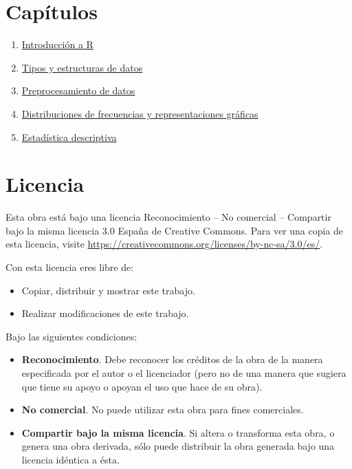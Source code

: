 \documentclass[
  spanish,
  a4paper,
]{scrreport}
\providecommand{\tightlist}{%
  \setlength{\itemsep}{0pt}\setlength{\parskip}{0pt}}
\theoremstyle{definition}
\theoremstyle{remark}
\begin{document}
\section*{Capítulos}\label{capuxedtulos}


\begin{enumerate}
\def\labelenumi{\arabic{enumi}.}
\tightlist
\item
  \href{./01-intro.qmd}{Introducción a R}
\item
  \href{02-tipos-datos.qmd}{Tipos y estructuras de datos}
\item
  \href{03-preprocesamiento-datos.qmd}{Preprocesamiento de datos}
\item
  \href{04-frecuencias-graficos.qmd}{Distribuciones de frecuencias y
  representaciones gráficas}
\item
  \href{05-descriptiva.qmd}{Estadística descriptiva}
\end{enumerate}

\section*{Licencia}\label{licencia}


Esta obra está bajo una licencia Reconocimiento -- No comercial --
Compartir bajo la misma licencia 3.0 España de Creative Commons. Para
ver una copia de esta licencia, visite
\url{https://creativecommons.org/licenses/by-nc-sa/3.0/es/}.

Con esta licencia eres libre de:

\begin{itemize}
\tightlist
\item
  Copiar, distribuir y mostrar este trabajo.
\item
  Realizar modificaciones de este trabajo.
\end{itemize}

Bajo las siguientes condiciones:

\begin{itemize}
\item
  \textbf{Reconocimiento}. Debe reconocer los créditos de la obra de la
  manera especificada por el autor o el licenciador (pero no de una
  manera que sugiera que tiene su apoyo o apoyan el uso que hace de su
  obra).
\item
  \textbf{No comercial}. No puede utilizar esta obra para fines
  comerciales.
\item
  \textbf{Compartir bajo la misma licencia}. Si altera o transforma esta
  obra, o genera una obra derivada, sólo puede distribuir la obra
  generada bajo una licencia idéntica a ésta.
\end{itemize}
\end{document}
